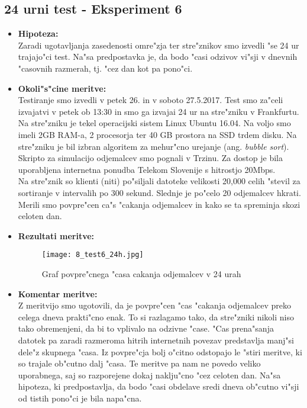 \newpage
\subsection{24 urni test - Eksperiment 6}
\begin{itemize}
	\item \textbf{Hipoteza: }  \\
		Zaradi ugotavljanja zasedenosti omre"zja ter stre"znikov smo izvedli "se 24 ur trajajo"ci test. Na"sa predpostavka je, da bodo "casi odzivov vi"sji v dnevnih "casovnih razmerah, tj. "cez dan kot pa pono"ci.

	\item \textbf{Okoli"s"cine meritve: } \\
		Testiranje smo izvedli v petek 26. in v soboto 27.5.2017. Test smo za"celi izvajatvi v petek ob 13:30 in smo ga izvajai 24 ur na stre"zniku v Frankfurtu. Na stre"zniku je tekel operacijski sistem Linux Ubuntu 16.04. Na voljo smo imeli 2GB RAM-a, 2 procesorja ter 40 GB prostora na SSD trdem disku. Na stre"zniku je bil izbran algoritem za mehur"cno urejanje (ang. \textit{bubble sort}).\\ Skripto za simulacijo odjemalcev smo pognali v Trzinu. Za dostop je bila uporabljena internetna ponudba Telekom Slovenije s hitrostjo 20Mbps.\\ Na stre"znik so klienti (niti) po"siljali datoteke velikosti 20,000 celih "stevil za sortiranje v intervalih po 300 sekund. Slednje je po"celo 20 odjemalcev hkrati. Merili smo povpre"cen ca"s "cakanja odjemalcev in kako se ta spreminja skozi celoten dan.

 	\item \textbf{Rezultati meritve: }  \\
		\begin{figure}[h]
  		\centering
  		  \texttt{[image: 8\_test6\_24h.jpg]}
  		\caption{Graf povpre"cnega "casa cakanja odjemalcev v 24 urah }
  		\label{8_graf_racunska_moc_50}
		\end{figure}

	\item \textbf{Komentar meritve: } \\
		Z meritvijo smo ugotovili, da je povpre"cen "cas "cakanja odjemalcev preko celega dneva prakti"cno enak. To si razlagamo tako, da stre"zniki nikoli niso tako obremenjeni, da bi to vplivalo na odzivne "case. "Cas prena"sanja datotek pa zaradi razmeroma hitrih internetnih povezav predstavlja manj"si dele"z skupnega "casa. Iz povpre"cja bolj o"citno odstopajo le "stiri meritve, ki so trajale ob"cutno dalj "casa. Te meritve pa nam ne povedo veliko uporabnega, saj so razporejene dokaj naklju"cno "cez celoten dan. Na"sa hipoteza, ki predpostavlja, da bodo "casi obdelave sredi dneva ob"cutno vi"sji od tistih pono"ci je bila napa"cna.
\end{itemize}

